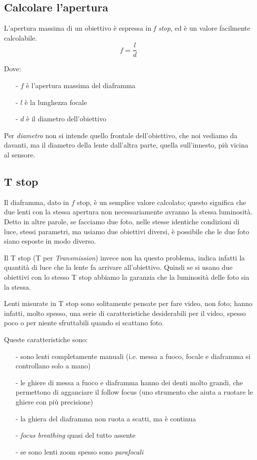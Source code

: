 \subsection{Calcolare l'apertura} \label{subsec:calcolareapertura}
L'apertura massima di un obiettivo è espressa in \textit{f stop}, ed è un valore facilmente calcolabile.
\[ f = \dfrac{l}{d} \]

Dove:
\begin{itemize}
    \item[-] $f$ è l'apertura massima del diaframma
    \item[-] $l$ è la lunghezza focale 
    \item[-] $d$ è il diametro dell'obiettivo 
\end{itemize}
Per \textit{diametro} non si intende quello frontale dell'obiettivo, che noi vediamo da davanti, ma il diametro della lente dall'altra parte, quella sull'innesto, più vicina al sensore.


\subsection{T stop} \label{subsec:tstop}
Il diaframma, dato in $f$ stop, è un semplice valore calcolato; questo significa che due lenti con la stessa apertura non necessariamente avranno la stessa luminosità.
Detto in altre parole, se facciamo due foto, nelle stesse identiche condizioni di luce, stessi parametri, ma usiamo due obiettivi diversi, è possibile che le due foto siano esposte in modo diverso.

Il T stop (T per \textit{Transmission}) invece non ha questo problema, indica infatti la quantità di luce che la lente fa arrivare all'obiettivo.
Quindi se si usano due obiettivi con lo stesso T stop abbiamo la garanzia che la luminosità delle foto sia la stessa.

Lenti misurate in T stop sono solitamente pensate per fare video, non foto; hanno infatti, molto spesso, una serie di caratteristiche desiderabili per il video, spesso poco o per niente sfruttabili quando si scattano foto.

Queste caratteristiche sono:
\begin{itemize}
    \item[-] sono lenti completamente manuali (i.e. messa a fuoco, focale e diaframma si controllano solo a mano)
    \item[-] le ghiere di messa a fuoco e diaframma hanno dei denti molto grandi, che permettono di agganciare il follow focus (uno strumento che aiuta a ruotare le ghiere con più precisione)
    \item[-] la ghiera del diaframma non ruota a scatti, ma è continua
    \item[-] \textit{focus breathing} quasi del tutto assente
    \item[-] se sono lenti zoom spesso sono \textit{parafocali}
\end{itemize}

